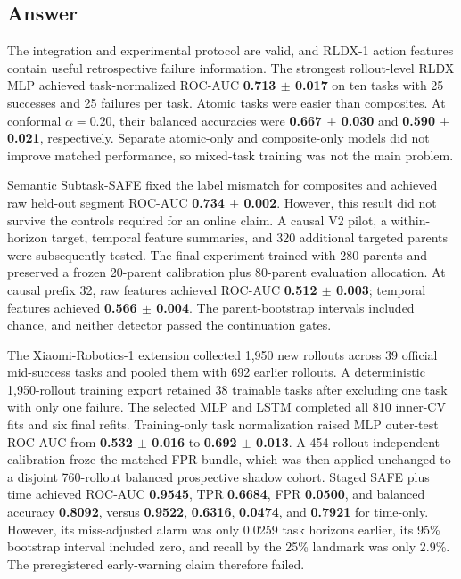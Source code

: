 \documentclass[11pt,a4paper]{article}
\newcommand{\metric}[1]{\textbf{#1}}
\begin{document}
\subsection{Answer}
The integration and experimental protocol are valid, and RLDX-1 action features contain useful retrospective failure information. The strongest rollout-level RLDX MLP achieved task-normalized ROC-AUC \metric{0.713 $\pm$ 0.017} on ten tasks with 25 successes and 25 failures per task. Atomic tasks were easier than composites. At conformal $\alpha=0.20$, their balanced accuracies were \metric{0.667 $\pm$ 0.030} and \metric{0.590 $\pm$ 0.021}, respectively. Separate atomic-only and composite-only models did not improve matched performance, so mixed-task training was not the main problem.

Semantic Subtask-SAFE fixed the label mismatch for composites and achieved raw held-out segment ROC-AUC \metric{0.734 $\pm$ 0.002}. However, this result did not survive the controls required for an online claim. A causal V2 pilot, a within-horizon target, temporal feature summaries, and 320 additional targeted parents were subsequently tested. The final experiment trained with 280 parents and preserved a frozen 20-parent calibration plus 80-parent evaluation allocation. At causal prefix 32, raw features achieved ROC-AUC \metric{0.512 $\pm$ 0.003}; temporal features achieved \metric{0.566 $\pm$ 0.004}. The parent-bootstrap intervals included chance, and neither detector passed the continuation gates.

The Xiaomi-Robotics-1 extension collected 1,950 new rollouts across 39 official mid-success tasks and pooled them with 692 earlier rollouts. A deterministic 1,950-rollout training export retained 38 trainable tasks after excluding one task with only one failure. The selected MLP and LSTM completed all 810 inner-CV fits and six final refits. Training-only task normalization raised MLP outer-test ROC-AUC from \metric{0.532 $\pm$ 0.016} to \metric{0.692 $\pm$ 0.013}. A 454-rollout independent calibration froze the matched-FPR bundle, which was then applied unchanged to a disjoint 760-rollout balanced prospective shadow cohort. Staged SAFE plus time achieved ROC-AUC \metric{0.9545}, TPR \metric{0.6684}, FPR \metric{0.0500}, and balanced accuracy \metric{0.8092}, versus \metric{0.9522}, \metric{0.6316}, \metric{0.0474}, and \metric{0.7921} for time-only. However, its miss-adjusted alarm was only 0.0259 task horizons earlier, its 95\% bootstrap interval included zero, and recall by the 25\% landmark was only 2.9\%. The preregistered early-warning claim therefore failed.
\end{document}
